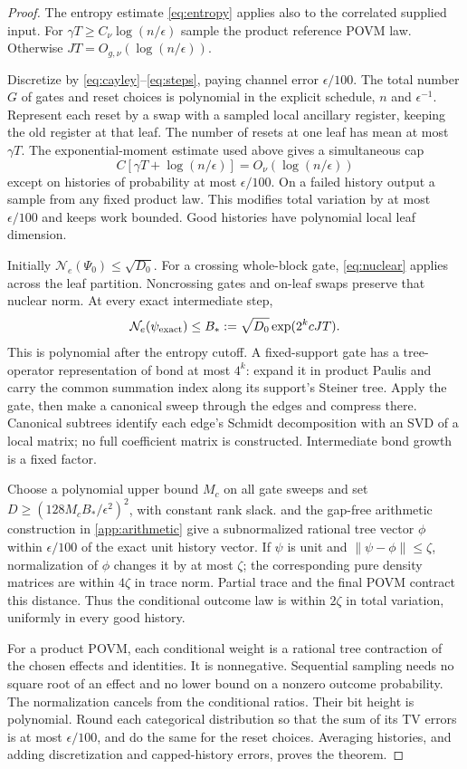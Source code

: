\documentclass[11pt,reqno]{amsart}
\numberwithin{equation}{section}
\theoremstyle{definition}
\theoremstyle{remark}
\newcommand{\nn}[1]{\lVert#1\rVert}
\newcommand{\cN}{\mathcal N}
\begin{document}
\begin{proof}
The entropy estimate \eqref{eq:entropy} applies also to the correlated supplied input. For $\gamma T\geq C_\nu\log(n/\epsilon)$ sample the product reference POVM law. Otherwise $JT=O_{g,\nu}(\log(n/\epsilon))$.

Discretize by \eqref{eq:cayley}--\eqref{eq:steps}, paying channel error $\epsilon/100$. The total number $G$ of gates and reset choices is polynomial in the explicit schedule, $n$ and $\epsilon^{-1}$. Represent each reset by a swap with a sampled local ancillary register, keeping the old register at that leaf. The number of resets at one leaf has mean at most $\gamma T$. The exponential-moment estimate used above gives a simultaneous cap
\[
 C[\gamma T+\log(n/\epsilon)]=O_\nu(\log(n/\epsilon))
\]
except on histories of probability at most $\epsilon/100$. On a failed history output a sample from any fixed product law. This modifies total variation by at most $\epsilon/100$ and keeps work bounded. Good histories have polynomial local leaf dimension.

Initially $\cN_e(\Psi_0)\leq\sqrt{D_0}$. For a crossing whole-block gate, \eqref{eq:nuclear} applies across the leaf partition. Noncrossing gates and on-leaf swaps preserve that nuclear norm. At every exact intermediate step,
\begin{equation}\label{eq:treeaction}
 \cN_e(\psi_{\rm exact})\leq
 B_*:=\sqrt{D_0}\exp(2^kcJT).
\end{equation}
This is polynomial after the entropy cutoff. A fixed-support gate has a tree-operator representation of bond at most $4^k$: expand it in product Paulis and carry the common summation index along its support's Steiner tree. Apply the gate, then make a canonical sweep through the edges and compress there. Canonical subtrees identify each edge's Schmidt decomposition with an SVD of a local matrix; no full coefficient matrix is constructed. Intermediate bond growth is a fixed factor.

Choose a polynomial upper bound $M_c$ on all gate sweeps and set
$D\geq(128M_c B_*/\epsilon^2)^2$, with constant rank slack.  and the gap-free arithmetic construction in \cref{app:arithmetic} give a subnormalized rational tree vector $\phi$ within $\epsilon/100$ of the exact unit history vector. If $\psi$ is unit and $\nn{\psi-\phi}\leq\zeta$, normalization of $\phi$ changes it by at most $\zeta$; the corresponding pure density matrices are within $4\zeta$ in trace norm. Partial trace and the final POVM contract this distance. Thus the conditional outcome law is within $2\zeta$ in total variation, uniformly in every good history.

For a product POVM, each conditional weight is a rational tree contraction of the chosen effects and identities. It is nonnegative. Sequential sampling needs no square root of an effect and no lower bound on a nonzero outcome probability. The normalization cancels from the conditional ratios. Their bit height is polynomial. Round each categorical distribution so that the sum of its TV errors is at most $\epsilon/100$, and do the same for the reset choices. Averaging histories, and adding discretization and capped-history errors, proves the theorem.
\end{proof}
\end{document}
